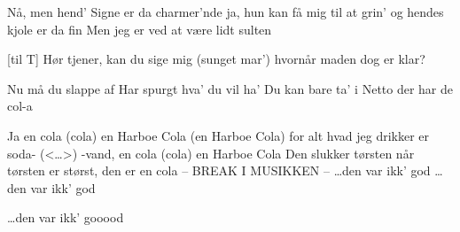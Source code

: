 \documentclass[a4paper,11pt]{article}
\begin{document}
\begin{song}



%
        Nå, men hend' Signe
        er da charmer'nde
        ja, hun kan få mig til at grin'
        og hendes kjole er da fin 
        Men jeg er ved at
        være lidt sulten 

[til T]%
        Hør tjener, kan du sige mig (sunget mar')
        hvornår maden dog er klar?

%
        Nu må du slappe af
        Har spurgt hva' du vil ha'
        Du kan bare ta' i Netto
        der har de col-a


%
        Ja en cola (cola)
        en Harboe Cola (en Harboe Cola)
        for alt hvad jeg drikker er soda- (<{\ldots}>)
        -vand, en cola (cola)
        en Harboe Cola
        Den slukker tørsten når tørsten er størst, den
        er en cola
        -- BREAK I MUSIKKEN -- 
        {\ldots}den var ikk' god
        {\ldots}den var ikk' god

        {\ldots}den var ikk' gooood

\end{song}
\end{document}
